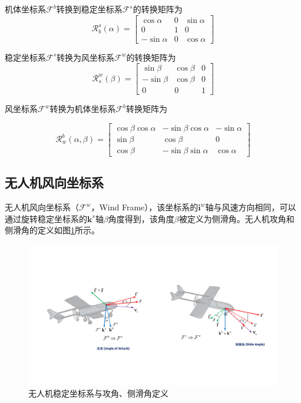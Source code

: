 机体坐标系$\mathcal{F}^b$转换到稳定坐标系$\mathcal{F}^s$的转换矩阵为
\begin{equation} 
	\mathcal{R}_b^s(\alpha) = \begin{bmatrix}
		\cos \alpha                             & 0                               & \sin \alpha         \\
		0 & 1   &0 \\
		-\sin \alpha   & 0 & \cos \alpha
	\end{bmatrix}
\end{equation}

稳定坐标系$\mathcal{F}^s$转换为风坐标系$\mathcal{F}^w$的转换矩阵为
\begin{equation} 
	\mathcal{R}_s^w(\beta) = \begin{bmatrix} \sin \beta  & \cos \beta  &  0      \\  - \sin \beta & \cos \beta   &0 \\  0   & 0 &1  \end{bmatrix}
\end{equation}

风坐标系$\mathcal{F}^w$转换为机体坐标系$\mathcal{F}^b$转换矩阵为

\begin{equation} 
	\mathcal{R}_w^b (\alpha,\beta) = \begin{bmatrix} \cos \beta \cos \alpha & - \sin \beta \cos \alpha  & - \sin \alpha      \\	 \sin \beta & \cos \beta   & 0 \\	\cos \beta   & -\sin \beta \sin \alpha & \cos \alpha \end{bmatrix}
\end{equation}

\subsection{无人机风向坐标系}
无人机风向坐标系（$\mathcal{F}^w$，Wind Frame），该坐标系的$\mathbf{i}^w$轴与风速方向相同，可以通过旋转稳定坐标系的$\mathbf{k}^s$轴$\beta$角度得到，该角度$\beta$被定义为侧滑角。无人机攻角和侧滑角的定义如图\ref{fig:chp02_03_uav_aoa_bank}所示。
\begin{figure}[tb]   
	\centering
	\includegraphics[width=\textwidth]{figs/chp02/chp02_03_uav_aoa_bank.pdf}
	\caption{无人机稳定坐标系与攻角、侧滑角定义}
	\label{fig:chp02_03_uav_aoa_bank}
\end{figure}

